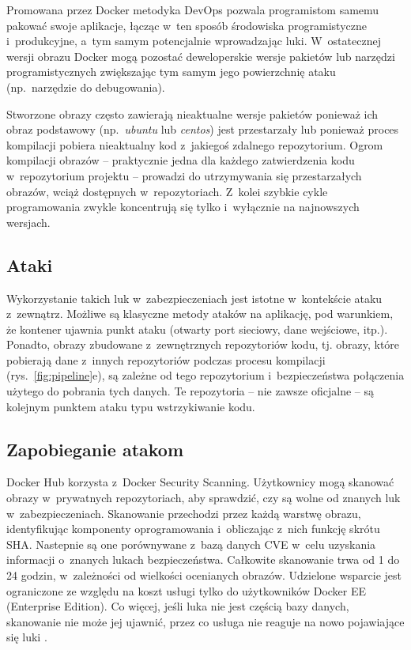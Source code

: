 Promowana przez Docker metodyka DevOps pozwala programistom samemu pakować swoje aplikacje, łącząc w~ten sposób środowiska programistyczne i~produkcyjne, a~tym samym potencjalnie wprowadzając luki. W~ostatecznej wersji obrazu Docker mogą pozostać deweloperskie wersje pakietów lub narzędzi programistycznych zwiększając tym samym jego powierzchnię ataku (np.~narzędzie do debugowania).

Stworzone obrazy często zawierają nieaktualne wersje pakietów ponieważ ich obraz podstawowy (np.~\textit{ubuntu} lub \textit{centos}) jest przestarzały lub ponieważ proces kompilacji pobiera nieaktualny kod z~jakiegoś zdalnego repozytorium. Ogrom kompilacji obrazów -- praktycznie jedna dla każdego zatwierdzenia kodu w~repozytorium projektu -- prowadzi do utrzymywania się przestarzałych obrazów, wciąż dostępnych w~repozytoriach. Z~kolei szybkie cykle programowania zwykle koncentrują się tylko i~wyłącznie na najnowszych wersjach.

\subsection{Ataki}

Wykorzystanie takich luk w~zabezpieczeniach jest istotne w~kontekście ataku z~zewnątrz. Możliwe są klasyczne metody ataków na aplikację, pod warunkiem, że kontener ujawnia punkt ataku (otwarty port sieciowy, dane wejściowe, itp.). Ponadto, obrazy zbudowane z~zewnętrznych repozytoriów kodu, tj. obrazy, które pobierają dane z~innych repozytoriów podczas procesu kompilacji (rys.~\ref{fig:pipeline}e), są zależne od tego repozytorium i~bezpieczeństwa połączenia użytego do pobrania tych danych. Te repozytoria -- nie zawsze oficjalne -- są kolejnym punktem ataku typu wstrzykiwanie kodu.

\subsection{Zapobieganie atakom}

Docker Hub korzysta z~Docker Security Scanning. Użytkownicy mogą skanować obrazy w~prywatnych repozytoriach, aby sprawdzić, czy są wolne od znanych luk w~zabezpieczeniach. Skanowanie przechodzi przez każdą warstwę obrazu, identyfikując komponenty oprogramowania i~obliczając z~nich funkcję skrótu SHA. Nastepnie są one porównywane z~bazą danych CVE w~celu uzyskania informacji o~znanych lukach bezpieczeństwa. Całkowite skanowanie trwa od 1 do 24 godzin, w~zależności od wielkości ocenianych obrazów. Udzielone wsparcie jest ograniczone ze względu na koszt usługi tylko do użytkowników Docker EE (Enterprise Edition). Co więcej, jeśli luka nie jest częścią bazy danych, skanowanie nie może jej ujawnić, przez co usługa nie reaguje na nowo pojawiające się luki \cite{DockerScanImagesForVulnerabilities}.

